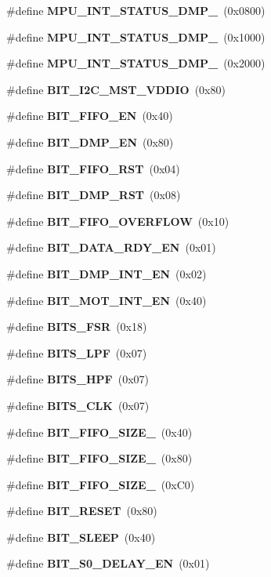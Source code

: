 \begin{DoxyCompactItemize}
\item 
\#define \textbf{ M\+P\+U\+\_\+\+I\+N\+T\+\_\+\+S\+T\+A\+T\+U\+S\+\_\+\+D\+M\+P\+\_}~(0x0800)
\item 
\#define \textbf{ M\+P\+U\+\_\+\+I\+N\+T\+\_\+\+S\+T\+A\+T\+U\+S\+\_\+\+D\+M\+P\+\_}~(0x1000)
\item 
\#define \textbf{ M\+P\+U\+\_\+\+I\+N\+T\+\_\+\+S\+T\+A\+T\+U\+S\+\_\+\+D\+M\+P\+\_}~(0x2000)
\item 
\#define \textbf{ B\+I\+T\+\_\+\+I2\+C\+\_\+\+M\+S\+T\+\_\+\+V\+D\+D\+IO}~(0x80)
\item 
\#define \textbf{ B\+I\+T\+\_\+\+F\+I\+F\+O\+\_\+\+EN}~(0x40)
\item 
\#define \textbf{ B\+I\+T\+\_\+\+D\+M\+P\+\_\+\+EN}~(0x80)
\item 
\#define \textbf{ B\+I\+T\+\_\+\+F\+I\+F\+O\+\_\+\+R\+ST}~(0x04)
\item 
\#define \textbf{ B\+I\+T\+\_\+\+D\+M\+P\+\_\+\+R\+ST}~(0x08)
\item 
\#define \textbf{ B\+I\+T\+\_\+\+F\+I\+F\+O\+\_\+\+O\+V\+E\+R\+F\+L\+OW}~(0x10)
\item 
\#define \textbf{ B\+I\+T\+\_\+\+D\+A\+T\+A\+\_\+\+R\+D\+Y\+\_\+\+EN}~(0x01)
\item 
\#define \textbf{ B\+I\+T\+\_\+\+D\+M\+P\+\_\+\+I\+N\+T\+\_\+\+EN}~(0x02)
\item 
\#define \textbf{ B\+I\+T\+\_\+\+M\+O\+T\+\_\+\+I\+N\+T\+\_\+\+EN}~(0x40)
\item 
\#define \textbf{ B\+I\+T\+S\+\_\+\+F\+SR}~(0x18)
\item 
\#define \textbf{ B\+I\+T\+S\+\_\+\+L\+PF}~(0x07)
\item 
\#define \textbf{ B\+I\+T\+S\+\_\+\+H\+PF}~(0x07)
\item 
\#define \textbf{ B\+I\+T\+S\+\_\+\+C\+LK}~(0x07)
\item 
\#define \textbf{ B\+I\+T\+\_\+\+F\+I\+F\+O\+\_\+\+S\+I\+Z\+E\+\_}~(0x40)
\item 
\#define \textbf{ B\+I\+T\+\_\+\+F\+I\+F\+O\+\_\+\+S\+I\+Z\+E\+\_}~(0x80)
\item 
\#define \textbf{ B\+I\+T\+\_\+\+F\+I\+F\+O\+\_\+\+S\+I\+Z\+E\+\_}~(0x\+C0)
\item 
\#define \textbf{ B\+I\+T\+\_\+\+R\+E\+S\+ET}~(0x80)
\item 
\#define \textbf{ B\+I\+T\+\_\+\+S\+L\+E\+EP}~(0x40)
\item 
\#define \textbf{ B\+I\+T\+\_\+\+S0\+\_\+\+D\+E\+L\+A\+Y\+\_\+\+EN}~(0x01)
\item 

\end{DoxyCompactItemize}
